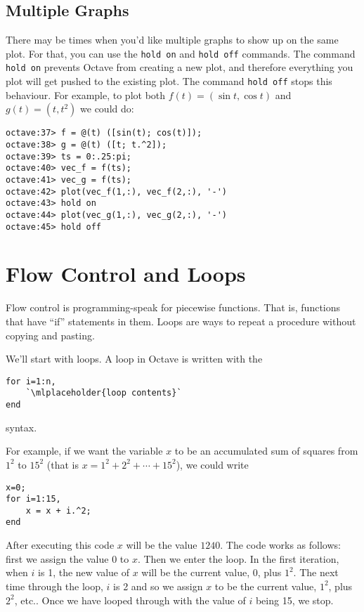 \documentclass[letter]{article}
\begin{document}
	\subsection{Multiple Graphs}
	There may be times when you'd like multiple graphs to show up on
	the same plot.  For that, you can use the {\tt hold on} and 
	{\tt hold off} commands.  The command {\tt hold on} prevents {\sc Octave}
	from creating a new plot, and therefore everything you plot will get pushed
	to the existing plot.  The command {\tt hold off} stops this behaviour.
	For example, to plot both $f(t) = (\sin t,\cos t)$ and $g(t)=(t,t^2)$ we
	could do:
	\begin{lstlisting}[style=Matlab-Pyglike,escapechar=`]
octave:37> f = @(t) ([sin(t); cos(t)]);
octave:38> g = @(t) ([t; t.^2]);
octave:39> ts = 0:.25:pi;
octave:40> vec_f = f(ts);
octave:41> vec_g = f(ts);
octave:42> plot(vec_f(1,:), vec_f(2,:), '-')
octave:43> hold on
octave:44> plot(vec_g(1,:), vec_g(2,:), '-')
octave:45> hold off
	\end{lstlisting}

	\section{Flow Control and Loops}
	Flow control is programming-speak for piecewise functions.  That is, functions that 
	have ``if'' statements in them.  Loops are ways to repeat a procedure without
	copying and pasting.


	We'll start with loops.  A loop in {\sc Octave} is written with the 
	\begin{lstlisting}[style=Matlab-Pyglike,escapechar=`]
for i=1:n,
    `\mlplaceholder{loop contents}`
end
	\end{lstlisting}
	syntax.

	For example, if we want the variable $x$ to be an accumulated sum of squares from $1^2$ to $15^2$ 
	(that is $x=1^2+2^2+\cdots+15^2$), we could write
	\begin{lstlisting}[style=Matlab-Pyglike,escapechar=`]
x=0;
for i=1:15,
    x = x + i.^2;
end
	\end{lstlisting}
	After executing this code $x$ will be the value $1240$.  The code works as follows: first we assign the value
	$0$ to $x$.  Then we enter the loop.  In the first iteration, when $i$ is 1, the new value of $x$ will be the current value,
	0, plus $1^2$.  The next time through the loop, $i$ is 2 and so we assign $x$ to be the current value, $1^2$, plus
	$2^2$, etc.. Once we have looped through with the value of $i$ being 15, we stop.
\end{document}
